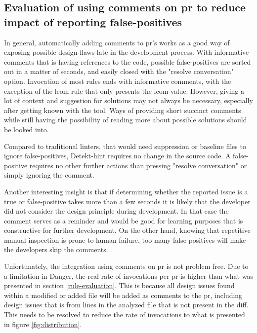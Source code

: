 \documentclass[pdftex,10pt,b5paper,twoside]{report}
\begin{document}
\begin{itemize}
\end{itemize}




\subsection{Evaluation of using comments on \gls{pr} to reduce impact of reporting false-positives}
\label{evaluation-comments}
In general, automatically adding comments to \gls{pr}'s works as a good way of exposing possible design flaws late in the development process. With informative comments that is having references to the code, possible false-positives are sorted out in a matter of seconds, and easily closed with the "resolve conversation" option. Invocation of most rules ends with informative comments, with the exception of the \gls{lcom} rule that only presents the \gls{lcom} value. However, giving a lot of context and suggestion for solutions may not always be necessary, especially after getting known with the tool. Ways of providing short succinct comments while still having the possibility of reading more about possible solutions should be looked into.

Compared to traditional linters, that would need suppression or baseline files to ignore false-positives, Detekt-hint requires no change in the source code. A false-positive requires no other further actions than pressing "resolve conversation" or simply ignoring the comment.  

Another interesting insight is that if determining whether the reported issue is a true or false-positive takes more than a few seconds it is likely that the developer did not consider the design principle during development. In that case the comment serves as a reminder and would be good for learning purposes that is constructive for further development. On the other hand, knowing that repetitive manual inspection is prone to human-failure, too many false-positives will make the developers skip the comments.

Unfortunately, the integration using comments on \gls{pr} is not problem free. Due to a limitation in Danger, the real rate of invocations per \gls{pr} is higher than what was presented in section \ref{rule-evaluation}. This is because all design issues found within a modified or added file will be added as comments to the pr, including design issues that is from lines in the analyzed file that is not present in the diff. This needs to be resolved to reduce the rate of invocations to what is presented in figure \ref{fig:distribution}.
\end{document}
